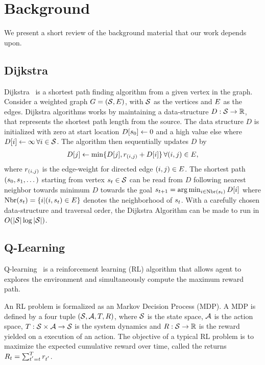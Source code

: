 \section{Background}

We present a short review of the background material that our work depends upon.

\subsection{Dijkstra}
\newcommand{\vertices}{\State}
\newcommand{\edge}{\rew}
\newcommand{\fwds}{D}
\newcommand{\dds}{D}
Dijkstra~\citep{dijkstra1959note} is a shortest path finding algorithm from a
given vertex in the graph. Consider a weighted graph $G = (\vertices,
\edges)$, with $\vertices$ as the vertices and $E$ as the edges. Dijkstra
algorithms works by maintaining a data-structure $\dds : \vertices \rightarrow
\R$, that represents the shortest path length from the source. The data
structure $\dds$ is initialized with zero at start location $\dds[\state_0]
\leftarrow 0$ and a high value else where $\dds[i] \leftarrow \infty \, \forall
i \in \vertices$. The algorithm then sequentially updates $\dds$ by
%
\begin{align}
  \dds[j] \leftarrow \min\{\dds[j], \edge_{(i, j)} + \dds[i] \} \, \forall (i, j) \in \edges ,
  \label{eq:dijkstra}
\end{align}%
%
where $\edge_{(i, j)}$ is the edge-weight for directed edge $(i, j) \in E$.
The shortest path $(s_0, s_{1}, \dots)$ starting from vertex
$\state_t \in \vertices$ can be read from $\dds$ following nearest neighbor
towards minimum $\fwds$ towards the goal $\state_{t+1} = \arg \min_{i \in
\text{Nbr}(\state_t)} \dds[i]$ where $\text{Nbr}(s_t) = \{ i | (i,
s_t) \in E \} $ denotes the neighborhood of $s_t$. With a
carefully chosen data-structure and traversal order, the Dijkstra Algorithm can
be made to run in $O(|\vertices|\log|\vertices|)$.

\subsection{Q-Learning}
Q-learning~\citep{watkins1992qlearning} is a reinforcement learning (RL)
algorithm that allows agent to explores the environment and simultaneously
compute the maximum reward path.

An RL problem is formalized as an Markov Decision Process (MDP). A MDP is
defined by a four tuple $(\mathcal{S}, \mathcal{A}, T, R)$, where $\mathcal{S}$ is the
state space, $\mathcal{A}$ is the action space, $T : \mathcal{S} \times \mathcal{A}
\rightarrow \mathcal{S}$ is the system dynamics and $R : \mathcal{S}
\rightarrow \mathbb{R} $ is the reward yielded on a execution of an action.
The objective of a typical RL problem is to maximize the expected cumulative
reward over time, called the returns  $ R_t = \sum_{t^{'}=t}^{T} r_{t^{'}}$.

